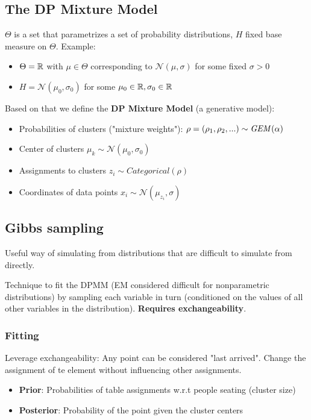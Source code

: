 \subsection{The DP Mixture Model}
$\Theta$ is a set that parametrizes a set of probability distributions, $H$ fixed base measure on $\Theta$. Example:
\begin{itemize}
	\item $\Theta = \mathbb R$ with $\mu\in \Theta$ corresponding to $\mathcal N(\mu, \sigma)$ for some fixed $\sigma > 0$
	\item $H = \mathcal N(\mu_0, \sigma_0)$ for some $\mu_0\in \mathbb R, \sigma_0\in \mathbb R$
\end{itemize}

Based on that we define the \textbf{DP Mixture Model} (a generative model):
\begin{itemize}
	\item Probabilities of clusters ("mixture weights"): $\rho = (\rho_1, \rho_2, ...)\sim\mathit{GEM}(\alpha)$
	\item Center of clusters $\mu_k\sim \mathcal N(\mu_0, \sigma_0)$
	\item Assignments to clusters $z_i\sim \mathit{Categorical}(\rho)$
	\item Coordinates of data points $x_i \sim \mathcal N(\mu_{z_i}, \sigma)$
\end{itemize}

\subsection{Gibbs sampling}
Useful way of simulating from distributions that are difficult to simulate from directly.

Technique to fit the DPMM (EM considered difficult for nonparametric distributions) by sampling each variable in turn (conditioned on the values of all other variables in the distribution). \textbf{Requires exchangeability}.
\subsubsection{Fitting}
Leverage exchangeability: Any point can be considered "last arrived". Change the assignment of te element without influencing other assignments.
\begin{itemize}
	\item \textbf{Prior}: Probabilities of table assignments w.r.t people seating (cluster size)
	\item \textbf{Posterior}: Probability of the point given the cluster centers
\end{itemize}

